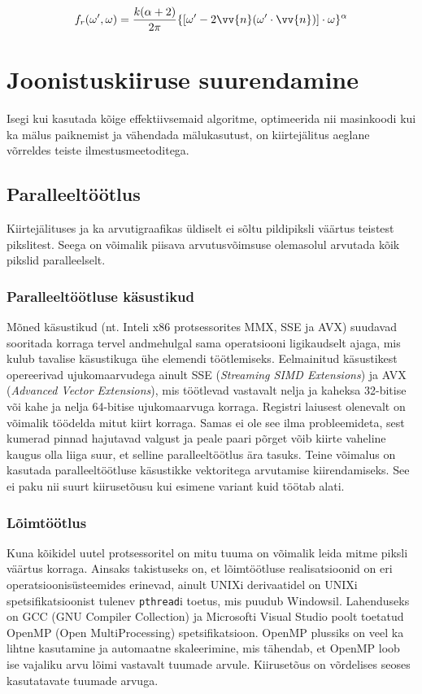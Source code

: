 \documentclass[a4paper,12pt]{report}
\renewcommand{\vec}[1]{\vv{#1}}
\begin{document}
\begin{equation}
f_r(\omega', \omega) = \frac{k(\alpha+2)}{2\pi}\{[\omega'-2\vec n(\omega'\cdot\vec n)]\cdot\omega\}^\alpha
\end{equation}

\section{Joonistuskiiruse suurendamine}
Isegi kui kasutada kõige effektiivsemaid algoritme, optimeerida nii
masinkoodi kui ka mälus paiknemist ja vähendada mälukasutust, on
kiirtejälitus aeglane võrreldes teiste ilmestusmeetoditega.

\subsection{Paralleeltöötlus}
Kiirtejälituses ja ka arvutigraafikas üldiselt ei sõltu pildipiksli
väärtus teistest pikslitest. Seega on võimalik piisava arvutusvõimsuse
olemasolul arvutada kõik pikslid paralleelselt.

\subsubsection{Paralleeltöötluse käsustikud}
Mõned käsustikud (nt. Inteli x86 protsessorites MMX, SSE ja AVX) suudavad
sooritada korraga tervel andmehulgal sama operatsiooni ligikaudselt ajaga,
mis kulub tavalise käsustikuga ühe elemendi töötlemiseks. Eelmainitud
käsustikest opereerivad uju\-koma\-arvudega ainult SSE (\textit{Streaming
SIMD Extensions}) ja AVX (\textit{Advanced Vector Extensions}), mis 
töötlevad vastavalt nelja ja kaheksa 32-bitise või kahe ja nelja 64-bitise
ujukomaarvuga korraga. Registri laiusest olenevalt on võimalik töödelda
mitut kiirt korraga. Samas ei ole see ilma probleemideta, sest kumerad
pinnad hajutavad valgust ja peale paari põrget võib kiirte vaheline kaugus
olla liiga suur, et selline paralleeltöötlus ära tasuks. Teine võimalus
on kasutada paralleeltöötluse käsustikke vektoritega arvutamise kiirendamiseks.
See ei paku nii suurt kiirusetõusu kui esimene variant kuid töötab alati.

\subsubsection{Lõimtöötlus}
Kuna kõikidel uutel protsessoritel on mitu tuuma on võimalik leida mitme
piksli väärtus korraga. Ainsaks takistuseks on, et lõimtöötluse realisatsioonid
on eri operatsiooni\-süstee\-mides erinevad, ainult UNIXi derivaatidel on
UNIXi spetsifikatsioonist tulenev \texttt{pthread}i toetus, mis puudub
Windowsil. Lahenduseks on GCC (GNU Compiler Collection) ja Microsofti
Visual Studio poolt toetatud OpenMP (Open MultiProcessing) spetsifikatsioon.
OpenMP plussiks on veel ka lihtne kasutamine ja automaatne skaleerimine,
mis tähendab, et OpenMP loob ise vajaliku arvu lõimi vastavalt tuumade
arvule. Kiirusetõus on võrdelises seoses kasutatavate tuumade arvuga.
\end{document}
